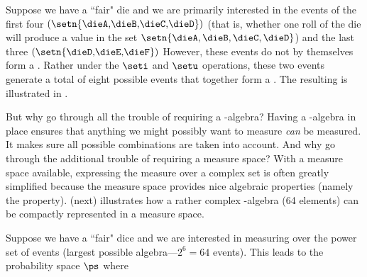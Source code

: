 \begin{example}
\label{ex:die_first4}
Suppose we have a ``fair" die and we are primarily interested in the
events of the first four
$\left(\setn{\text{\dieA,\dieB,\dieC,\dieD}}\right)$
(that is, whether one roll of the die will produce
a value in the set $\setn{\dieA,\dieB,\dieC,\dieD}$)
and the last three
$\left(\setn{\text{\dieD,\dieE,\dieF}}\right)$
However, these events do not by themselves form a .
Rather under the $\seti$ and $\setu$ operations, these two events generate
a total of eight possible events that together form a .
The resulting  is illustrated in .
\end{example}

But why go through all the trouble of requiring a \txsigma-algebra?
Having a \txsigma-algebra in place ensures that anything we might possibly
want to measure {\em can} be measured.
It makes sure all possible combinations are taken into account.
And why go through the additional trouble of requiring a measure space?
With a measure space available, expressing the measure over a complex
set is often greatly simplified because the measure space provides nice
algebraic properties (namely the  property).
 (next) illustrates how a rather complex
\txsigma-algebra (64 elements) can be compactly represented in a measure space.
\begin{example}
\label{ex:prob_123456}
Suppose we have a ``fair" dice and we are interested in measuring over the
power set of events (largest possible algebra---$2^6=64$ events).
This leads to the probability space $\ps$ where
\end{example}

